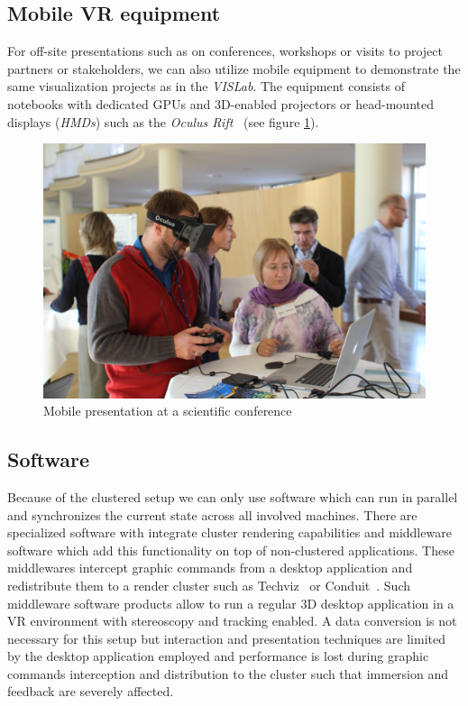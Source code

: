 \documentclass[twocolumn]{svjour3}          %
\begin{document}
\subsection{Mobile VR equipment}
\label{mobile-vr-equipment}

For off-site presentations such as on conferences, workshops or visits to project partners or stakeholders, we can also utilize mobile equipment to demonstrate the same visualization projects as in the \emph{VISLab}. The equipment consists of notebooks with dedicated GPUs and 3D-enabled projectors or head-mounted displays (\emph{HMDs}) such as the \emph{Oculus Rift}~\cite{web:rift} (see figure \ref{fig:rift}).

\begin{figure}
  \includegraphics[width=\linewidth]{images/rift.jpg}
\caption{Mobile presentation at a scientific conference}
\label{fig:rift}
\end{figure}

\subsection{Software}
\label{software}

Because of the clustered setup we can only use software which can run in parallel and synchronizes the current state across all involved machines. There are specialized software with integrate cluster rendering capabilities and middleware software which add this functionality on top of non-clustered applications. These middlewares intercept graphic commands from a desktop application and redistribute them to a render cluster such as Techviz~\cite{web:techviz} or Conduit~\cite{web:conduit}. Such middleware software products allow to run a regular 3D desktop application in a VR environment with stereoscopy and tracking enabled. A data conversion is not necessary for this setup but interaction and presentation techniques are limited by the desktop application employed and performance is lost during graphic commands interception and distribution to the cluster such that immersion and feedback are severely affected.
\end{document}
